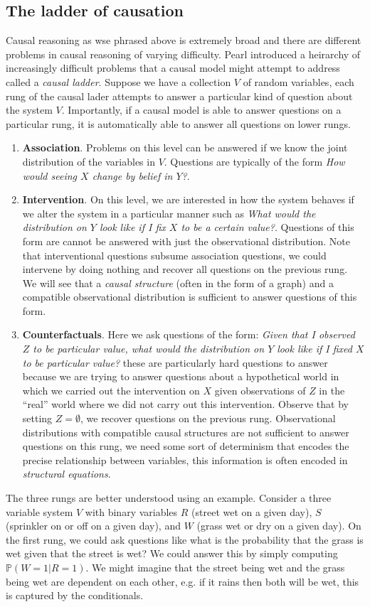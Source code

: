 \documentclass[../main.tex]{subfiles}
\begin{document}
   \subsection{The ladder of causation}
   Causal reasoning as wse phrased above is extremely broad and there are different problems in causal reasoning of varying difficulty. Pearl introduced a heirarchy of increasingly difficult problems that a causal model might attempt to address called a \emph{causal ladder}\cite{pearl2000causality}. Suppose we have a collection ${V}$ of random variables, each rung of the causal lader attempts to answer a particular kind of question about the system $V$. Importantly, if a causal model is able to answer questions on a particular rung, it is automatically able to answer all questions on lower rungs. 
   \begin{enumerate}
      \item \textbf{Association}. Problems on this level can be answered if we know the joint distribution of the variables in ${V}$. Questions are typically of the form \emph{How would seeing ${X}$ change by belief in ${Y}$?}. 
      \item \textbf{Intervention}. On this level, we are interested in how the system behaves if we alter the system in a particular manner such as \emph{What would the distribution on $Y$ look like if I fix $X$ to be a certain value?}. Questions of this form are cannot be answered with just the observational distribution. Note that interventional questions subsume association questions, we could intervene by doing nothing and recover all questions on the previous rung. We will see that a \emph{causal structure} (often in the form of a graph) and a compatible observational distribution is sufficient to answer questions of this form. 
      \item \textbf{Counterfactuals}. Here we ask questions of the form: \emph{Given that I observed ${Z}$ to be particular value, what would the distribution on ${Y}$ look like if I fixed ${X}$ to be particular value?} these are particularly hard questions to answer because we are trying to answer questions about a hypothetical world in which we carried out the intervention on ${X}$ given observations of ${Z}$ in the ``real'' world where we did not carry out this intervention. Observe that by setting ${Z=\emptyset}$, we recover questions on the previous rung. Observational distributions with compatible causal structures are not sufficient to answer questions on this rung, we need some sort of determinism that encodes the precise relationship between variables, this information is often encoded in \emph{structural equations}. 
   \end{enumerate}
   The three rungs are better understood using an example. Consider a three variable system ${V}$ with binary variables ${R}$ (street wet on a given day), $S$ (sprinkler on or off on a given day), and $W$ (grass wet or dry on a given day). On the first rung, we could ask questions like what is the probability that the grass is wet given that the street is wet? We could answer this by simply computing ${\mathbb{P}(W=1|R=1)}$. We might imagine that the street being wet and the grass being wet are dependent on each other, e.g. if it rains then both will be wet, this is captured by the conditionals. 
\end{document}
